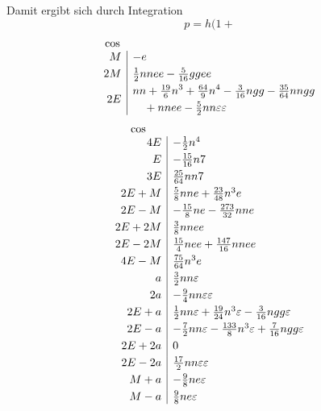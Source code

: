 \noindent Damit ergibt sich durch Integration
\[
p=h(1+
\]
\[
\begin{array}{r|l}
\multicolumn{1}{c}{\cos}&\\
M&-e\\[3pt]
2M&\tfrac12nnee-\tfrac{5}{16}ggee\\[3pt]
2E&\begin{aligned}
&nn+\tfrac{19}{6}n^3+\tfrac{64}{9}n^4-\tfrac{3}{16}ngg-\tfrac{35}{64}nngg\\
&\quad+nnee-\tfrac52nn\varepsilon\varepsilon
\end{aligned}
\end{array}
\]
\[
\begin{array}{r|l}
\multicolumn{1}{c}{\cos}&\\
4E&-\tfrac12n^4\\[3pt]
E&-\tfrac{15}{16}n7\\[3pt]
3E&\tfrac{25}{64}nn7\\[3pt]
2E+M&\tfrac58nne+\tfrac{23}{48}n^3e\\[3pt]
2E-M&-\tfrac{15}{8}ne-\tfrac{273}{32}nne\\[3pt]
2E+2M&\tfrac38nnee\\[3pt]
2E-2M&\tfrac{15}{4}nee+\tfrac{147}{16}nnee\\[3pt]
4E-M&\tfrac{75}{64}n^3e\\[3pt]
a&\tfrac32nn\varepsilon\\[3pt]
2a&-\tfrac94nn\varepsilon\varepsilon\\[3pt]
2E+a&\tfrac12nn\varepsilon+\tfrac{19}{24}n^3\varepsilon-\tfrac{3}{16}ngg\varepsilon\\[3pt]
2E-a&-\tfrac72nn\varepsilon-\tfrac{133}{8}n^3\varepsilon+\tfrac{7}{16}ngg\varepsilon\\[3pt]
2E+2a&0\\[3pt]
2E-2a&\tfrac{17}{2}nn\varepsilon\varepsilon\\[3pt]
M+a&-\tfrac98ne\varepsilon\\[3pt]
M-a&\tfrac98ne\varepsilon
\end{array}
\]
